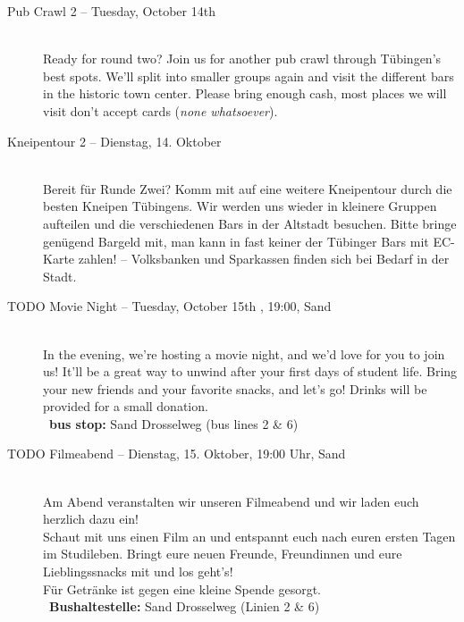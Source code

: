 \begin{description}
\ifml
\item[Pub Crawl 2 -- Tuesday, October 14th \YEAR]~\\
    Ready for round two? Join us for another pub crawl through Tübingen's best spots.
    We'll split into smaller groups again and visit the different bars in the historic town center.
    Please bring enough cash, most places we will visit don't accept cards (\emph{none whatsoever}).
\else
\item[Kneipentour 2 -- Dienstag, 14. Oktober \YEAR]~\\
    Bereit für Runde Zwei? Komm mit auf eine weitere Kneipentour durch die besten Kneipen Tübingens.
    Wir werden uns wieder in kleinere Gruppen aufteilen und die verschiedenen Bars in der Altstadt besuchen.
    Bitte bringe genügend Bargeld mit, man kann in fast keiner der Tübinger Bars mit EC-Karte zahlen! -- Volksbanken und Sparkassen finden sich bei Bedarf in der Stadt.
\fi

\ifml
    \item[TODO Movie Night -- Tuesday, October 15th \YEAR, 19:00, Sand]~\\%
    In the evening, we're hosting a movie night, and we'd love for you to join us!
    It'll be a great way to unwind after your first days of student life.
    Bring your new friends and your favorite snacks, and let's go!
    Drinks will be provided for a small donation.\\
    ~\textbf{bus stop:} Sand Drosselweg (bus lines 2 \& 6)
\else
    \item[TODO Filmeabend -- Dienstag, 15. Oktober, 19:00 Uhr, Sand]~\\
    Am Abend veranstalten wir unseren Filmeabend und wir laden euch herzlich dazu ein!\\
    Schaut mit uns einen Film an und entspannt euch nach euren ersten Tagen im Studileben.
    Bringt eure neuen Freunde, Freundinnen und eure Lieblingssnacks mit und los geht's!\\
    Für Getränke ist gegen eine kleine Spende gesorgt.\\
    ~\textbf{Bushaltestelle:} Sand Drosselweg (Linien 2 \& 6)
\fi

\ifbachelor \pagebreak \fi
\ifmaster \ifinfo \iflehramt \else \pagebreak \fi \fi \fi
\ifmaster \ifmedien \pagebreak \fi \fi
\ifmaster \ifmedinfo \pagebreak \fi \fi
\ifmaster \ifkogwiss \pagebreak \fi \fi


\end{description}
